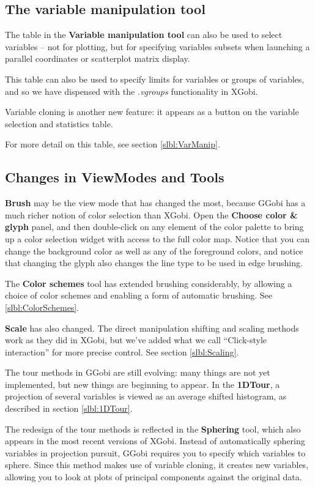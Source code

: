 \documentclass[11pt]{article}
\begin{document}
\subsection {The variable manipulation tool}

The table in the {\bf Variable manipulation tool} can also be used to
select variables -- not for plotting, but for specifying variables
subsets when launching a parallel coordinates or scatterplot matrix display.

This table can also be used to specify limits for variables or groups
of variables, and so we have dispensed with the {\em .vgroups}
functionality in XGobi.

Variable cloning is another new feature: it appears as a button
on the variable selection and statistics table.

For more detail on this table, see section \ref{slbl:VarManip}.

\subsection{Changes in ViewModes and Tools}

{\bf Brush} may be the view mode that has changed the most,
because GGobi has a much richer notion of color selection than
XGobi.  Open the {\bf Choose color \& glyph} panel, and then
double-click on any element of the color palette to bring up a color
selection widget with access to the full color map.  Notice that you
can change the background color as well as any of the foreground
colors, and notice that changing the glyph also changes the line
type to be used in edge brushing.

The {\bf Color schemes} tool has extended brushing considerably,
by allowing a choice of color schemes and enabling a form of
automatic brushing.  See \ref{slbl:ColorSchemes}.

{\bf Scale} has also changed.  The direct manipulation shifting and
scaling methods work as they did in XGobi, but we've added what we
call ``Click-style interaction'' for more precise control.  See section
\ref{slbl:Scaling}.

The tour methods in GGobi are still evolving: many things are not yet
implemented, but new things are beginning to appear.  In the {\bf
1DTour}, a projection of several variables is viewed as an average
shifted histogram, as described in section \ref{slbl:1DTour}.

The redesign of the tour methods is reflected in the {\bf Sphering}
tool, which also appears in the most recent versions of XGobi.
Instead of automatically sphering variables in projection pursuit,
GGobi requires you to specify which variables to sphere.  Since this
method makes use of variable cloning, it creates new variables,
allowing you to look at plots of principal components against the
original data.
\end{document}
